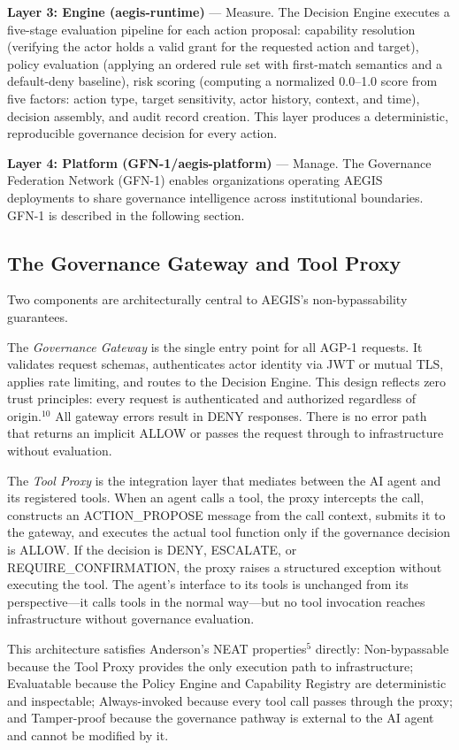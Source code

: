 \documentclass{IEEEcsmag}
\begin{document}
{\bf Layer 3: Engine (aegis-runtime)} --- Measure. The Decision Engine executes a five-stage evaluation pipeline for each action proposal: capability resolution (verifying the actor holds a valid grant for the requested action and target), policy evaluation (applying an ordered rule set with first-match semantics and a default-deny baseline), risk scoring (computing a normalized 0.0--1.0 score from five factors: action type, target sensitivity, actor history, context, and time), decision assembly, and audit record creation. This layer produces a deterministic, reproducible governance decision for every action.

{\bf Layer 4: Platform (GFN-1/aegis-platform)} --- Manage. The Governance Federation Network (GFN-1) enables organizations operating AEGIS deployments to share governance intelligence across institutional boundaries. GFN-1 is described in the following section.

\subsection{The Governance Gateway and Tool Proxy}

Two components are architecturally central to AEGIS's non-bypassability guarantees.

The {\it Governance Gateway} is the single entry point for all AGP-1 requests. It validates request schemas, authenticates actor identity via JWT or mutual TLS, applies rate limiting, and routes to the Decision Engine. This design reflects zero trust principles: every request is authenticated and authorized regardless of origin.$^{10}$ All gateway errors result in DENY responses. There is no error path that returns an implicit ALLOW or passes the request through to infrastructure without evaluation.

The {\it Tool Proxy} is the integration layer that mediates between the AI agent and its registered tools. When an agent calls a tool, the proxy intercepts the call, constructs an ACTION\_PROPOSE message from the call context, submits it to the gateway, and executes the actual tool function only if the governance decision is ALLOW. If the decision is DENY, ESCALATE, or REQUIRE\_CONFIRMATION, the proxy raises a structured exception without executing the tool. The agent's interface to its tools is unchanged from its perspective---it calls tools in the normal way---but no tool invocation reaches infrastructure without governance evaluation.

This architecture satisfies Anderson's NEAT properties$^{5}$ directly: Non-bypassable because the Tool Proxy provides the only execution path to infrastructure; Evaluatable because the Policy Engine and Capability Registry are deterministic and inspectable; Always-invoked because every tool call passes through the proxy; and Tamper-proof because the governance pathway is external to the AI agent and cannot be modified by it.
\end{document}
